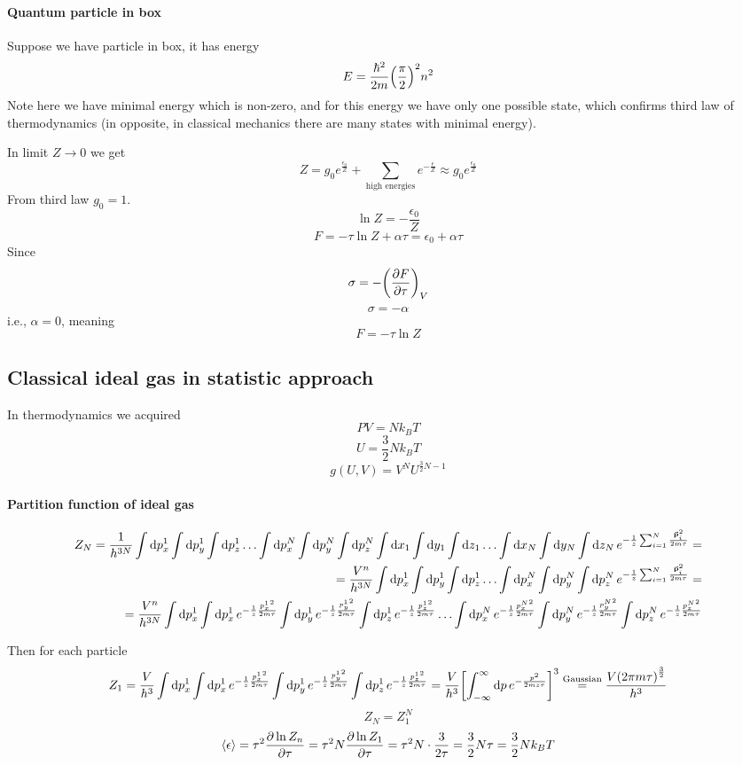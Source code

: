\paragraph{Quantum particle in box}
Suppose we have particle in box, it has energy
$$E=\frac{\hbar^2}{2m} \qty(\frac{\pi}{2})^2 n^2$$
Note here we have minimal energy which is non-zero, and for this energy we have only one possible state, which confirms third law of thermodynamics (in opposite, in classical mechanics there are many states with minimal energy).

In limit $Z\to 0$ we get
$$Z = g_0e^{\frac{\epsilon_0}{Z}} +\sum_{\text{high energies}} e^{-\frac{\epsilon}{Z}} \approx  g_0e^{\frac{\epsilon_0}{Z}}$$
From third law $g_0=1$.
$$\ln Z = -\frac{\epsilon_0}{Z}$$
$$F = -\tau \ln Z + \alpha \tau = \epsilon_0 +\alpha \tau$$
Since 
$$\sigma = -\qty(\pdv{F}{\tau})_V$$
$$\sigma=-\alpha$$
i.e., $\alpha = 0$, meaning
$$F= -\tau \ln Z$$
\subsection{Classical ideal gas in statistic approach}
In thermodynamics we acquired 
$$PV=Nk_BT$$
$$U=\frac{3}{2} Nk_BT$$
$$g(U,V) =V^N U^{\frac{3}{2}N-1}$$
\paragraph{Partition function of ideal gas}
\begin{align*}
	Z_N = \frac{1}{h^{3N}} \int \dd{p_x^1} \int \dd{p_y^1} \int \dd{p_z^1} \dots  \int \dd{p_x^N} \int \dd{p_y^N} \int \dd{p_z^N} \int \dd{x_1} \int \dd{y_1} \int \dd{z_1} \dots  \int \dd{x_N} \int \dd{y_N} \int \dd{z_N} e^{-\frac{1}{z} \sum_{i=1}^N \frac{\va{p}_i^2}{2m\tau}} =\\=
	\frac{V^n}{h^{3N}} \int \dd{p_x^1} \int \dd{p_y^1} \int \dd{p_z^1} \dots  \int \dd{p_x^N} \int \dd{p_y^N} \int \dd{p_z^N} e^{-\frac{1}{z} \sum_{i=1}^N \frac{\va{p}_i^2}{2m\tau}} =\\=
	\frac{V^n}{h^{3N}} \int \dd{p_x^1} \int \dd{p_x^1} e^{-\frac{1}{z} \frac{{p_x^1}^2}{2m\tau}} \int \dd{p_y^1} e^{-\frac{1}{z} \frac{{p_y^1}^2}{2m\tau}} \int \dd{p_z^1} e^{-\frac{1}{z} \frac{{p_z^1}^2}{2m\tau}} \dots  \int \dd{p_x^N} e^{-\frac{1}{z} \frac{{p_x^N}^2}{2m\tau}} \int \dd{p_y^N} e^{-\frac{1}{z} \frac{{p_y^N}^2}{2m\tau}} \int \dd{p_z^N} e^{-\frac{1}{z} \frac{{p_z^N}^2}{2m\tau}}
\end{align*}

Then for each particle
\begin{align*}
Z_1 = \frac{V}{h^{3}} \int \dd{p_x^1}  \int \dd{p_x^1} e^{-\frac{1}{z} \frac{{p_x^1}^2}{2m\tau}} \int \dd{p_y^1} e^{-\frac{1}{z} \frac{{p_y^1}^2}{2m\tau}} \int \dd{p_z^1} e^{-\frac{1}{z} \frac{{p_z^1}^2}{2m\tau}} = \frac{V}{h^{3}} \qty[\int_{-\infty}^\infty \dd{p} e^{- \frac{p^2}{2mz\tau}}]^3 \stackrel{\text{Gaussian}}{=}  \frac{V\qty(2\pi m \tau )^{\frac{3}{2}}}{h^{3}}
\end{align*}
$$Z_N = Z_1^N$$
\begin{align*}
\expval{\epsilon} = \tau^2 \pdv{\ln Z_n}{\tau} = \tau^2 N \pdv{\ln Z_1}{\tau} = \tau^2 N \cdot \frac{3}{2\tau} = \frac{3}{2} N\tau = \frac{3}{2} Nk_BT
\end{align*}
